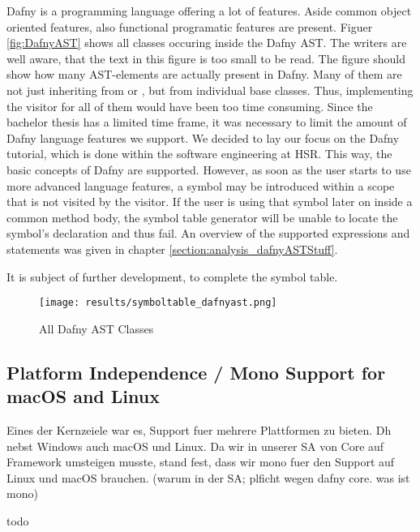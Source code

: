 Dafny is a programming language offering a lot of features.
Aside common object oriented features, also functional programatic features are present.
Figuer \ref{fig:DafnyAST} shows all classes occuring inside the Dafny AST.
The writers are well aware, that the text in this figure is too small to be read.
The figure should  show how many AST-elements are actually present in Dafny.
Many of them are not just inheriting from  or , but from individual base classes.
Thus, implementing the visitor for all of them would have been too time consuming.
Since the bachelor thesis has a limited time frame, it was necessary to limit the amount of Dafny language features we support.
We decided to lay our focus on the Dafny tutorial, which is done within the software engineering at HSR.
This way, the basic concepts of Dafny are supported.
However, as soon as the user starts to use more advanced language features, a symbol may be introduced within a scope that is not visited by the visitor.
If the user is using that symbol later on inside a common method body, the symbol table generator will be unable to locate the symbol's declaration and thus fail.
An overview of the supported expressions and statements was given in chapter \ref{section:analysis_dafnyASTStuff}.


It is subject of further development, to complete the symbol table.
\begin{figure}[h]
    \centering
    \texttt{[image: results/symboltable\_dafnyast.png]}
    \caption{All Dafny AST Classes}
    \label{fig:dafnyASTOverview}
\end{figure}



\subsection{Platform Independence / Mono Support for macOS and Linux}
Eines der Kernzeiele war es, Support fuer mehrere Plattformen zu bieten. Dh nebst Windows auch macOS und Linux.
Da wir in unserer SA von Core auf Framework umsteigen musste, stand fest, dass wir mono fuer den Support auf Linux und macOS brauchen.
(warum in der SA; plficht wegen dafny core. was ist mono)

todo

